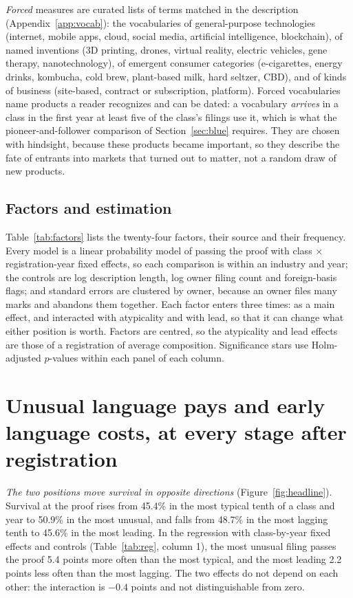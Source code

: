 \emph{Forced} measures are curated lists of terms matched in the
description (Appendix~\ref{app:vocab}): the vocabularies of
general-purpose technologies (internet, mobile apps, cloud, social
media, artificial intelligence, blockchain), of named inventions (3D
printing, drones, virtual reality, electric vehicles, gene therapy,
nanotechnology), of emergent consumer categories (e-cigarettes, energy
drinks, kombucha, cold brew, plant-based milk, hard seltzer, CBD), and
of kinds of business (site-based, contract or subscription, platform).
Forced vocabularies name products a reader recognizes and can be dated:
a vocabulary \emph{arrives} in a class in the first year at least five
of the class's filings use it, which is what the pioneer-and-follower
comparison of Section~\ref{sec:blue} requires. They are chosen with
hindsight, because these products became important, so they describe
the fate of entrants into markets that turned out to matter, not a
random draw of new products.

\subsection{Factors and estimation}

Table~\ref{tab:factors} lists the twenty-four factors, their source and
their frequency. Every model is a linear probability model of passing
the proof with class $\times$ registration-year fixed effects, so each
comparison is within an industry and year; the controls are log
description length, log owner filing count and foreign-basis flags; and
standard errors are clustered by owner, because an owner files many
marks and abandons them together. Each factor enters three times: as a
main effect, and interacted with atypicality and with lead, so that it
can change what either position is worth. Factors are centred, so the
atypicality and lead effects are those of a registration of average
composition. Significance stars use Holm-adjusted $p$-values within each
panel of each column.



\section{Unusual language pays and early language costs, at every stage
after registration}\label{sec:headline}

\emph{The two positions move survival in opposite directions}
(Figure~\ref{fig:headline}). Survival at the proof rises from 45.4\% in
the most typical tenth of a class and year to 50.9\% in the most unusual,
and falls from 48.7\% in the most lagging tenth to 45.6\% in the most
leading. In the regression with class-by-year fixed effects and
controls (Table~\ref{tab:reg}, column 1), the most unusual filing passes
the proof 5.4 points more often than the most typical, and the most
leading 2.2 points less often than the most lagging. The two effects do
not depend on each other: the interaction is $-0.4$ points and not
distinguishable from zero.

